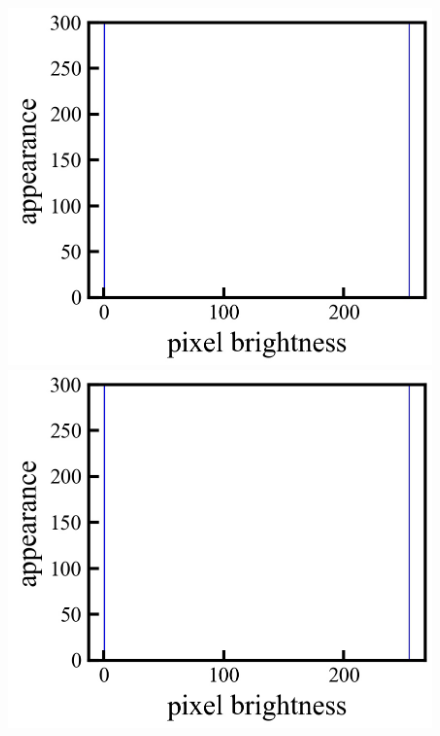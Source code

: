 \begin{figure}[h]
	\begin{center}
		\begin{minipage}{0.3\linewidth}
			\includegraphics[width=0.98\columnwidth]{./theory/figure/5/binary_0.jpg}
		\end{minipage}
		\begin{minipage}{0.3\linewidth}
			\includegraphics[width=0.98\columnwidth]{./theory/figure/5/binary_1.jpg}
		\end{minipage}
		\begin{minipage}{0.3\linewidth}

\end{minipage}
\end{center}
\end{figure}
